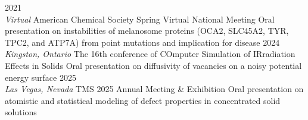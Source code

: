 \documentclass[9pt]{developercv} %
\begin{document}
\begin{entrylist}
    \entry
        {2021 \\ \color{gray} \textit{Virtual}}
        {American Chemical Society Spring Virtual National Meeting}
        {}
        {Oral presentation on instabilities of melanosome proteins (OCA2, SLC45A2, TYR, TPC2, and ATP7A) from point mutations and implication for disease}
    \entry
        {2024 \\ \color{gray} \textit{Kingston, Ontario}}
        {The 16th conference of COmputer Simulation of IRradiation Effects in Solids}
        {}
        {Oral presentation on diffusivity of vacancies on a noisy potential energy surface}
    \entry
        {2025 \\ \color{gray} \textit{Las Vegas, Nevada}} {TMS 2025 Annual Meeting \& Exhibition} {} {Oral presentation on atomistic and statistical modeling of defect properties in concentrated solid solutions}
\end{entrylist}
\end{document}

